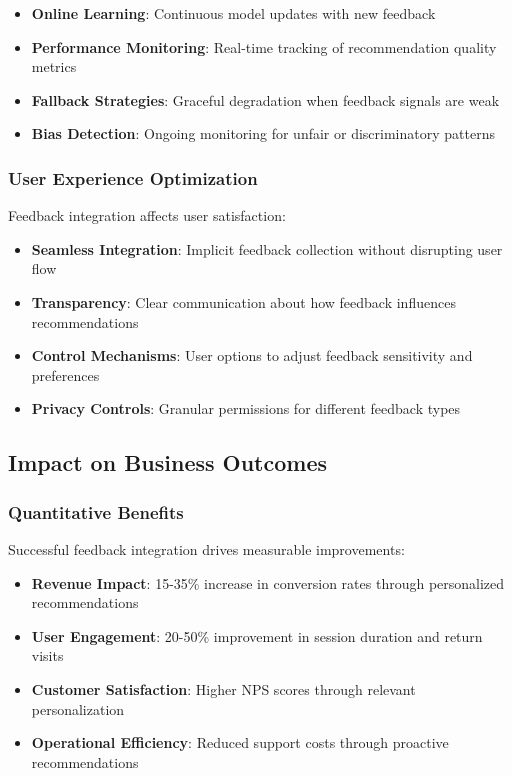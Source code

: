 \begin{itemize}
    \item \textbf{Online Learning}: Continuous model updates with new feedback
    \item \textbf{Performance Monitoring}: Real-time tracking of recommendation quality metrics
    \item \textbf{Fallback Strategies}: Graceful degradation when feedback signals are weak
    \item \textbf{Bias Detection}: Ongoing monitoring for unfair or discriminatory patterns
\end{itemize}

\subsubsection{User Experience Optimization}

Feedback integration affects user satisfaction:

\begin{itemize}
    \item \textbf{Seamless Integration}: Implicit feedback collection without disrupting user flow
    \item \textbf{Transparency}: Clear communication about how feedback influences recommendations
    \item \textbf{Control Mechanisms}: User options to adjust feedback sensitivity and preferences
    \item \textbf{Privacy Controls}: Granular permissions for different feedback types
\end{itemize}

\subsection{Impact on Business Outcomes}

\subsubsection{Quantitative Benefits}

Successful feedback integration drives measurable improvements:

\begin{itemize}
    \item \textbf{Revenue Impact}: 15-35\% increase in conversion rates through personalized recommendations
    \item \textbf{User Engagement}: 20-50\% improvement in session duration and return visits
    \item \textbf{Customer Satisfaction}: Higher NPS scores through relevant personalization
    \item \textbf{Operational Efficiency}: Reduced support costs through proactive recommendations
\end{itemize}


